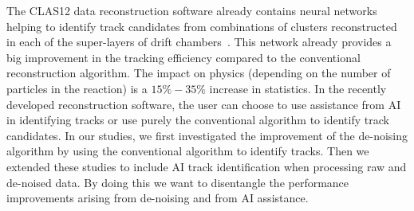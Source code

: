 The CLAS12 data reconstruction software already contains neural networks helping to identify track candidates from combinations of clusters reconstructed in each of the super-layers of drift chambers~\cite{Gavalian:2020mlp}.
This network already provides a big improvement in the tracking efficiency compared to the conventional reconstruction algorithm. The impact on physics (depending on the number of particles in the reaction) is a $15\%-35\%$ increase in statistics. 
In the recently developed reconstruction software, the user can choose to use assistance from AI in identifying tracks or use purely the conventional algorithm to identify track candidates. In our studies, we first investigated the improvement of the de-noising algorithm by using the conventional algorithm to identify tracks. Then we extended these studies to include AI track identification when processing raw and de-noised data. By doing this we want to disentangle the performance improvements arising from de-noising and from AI assistance. 


 
